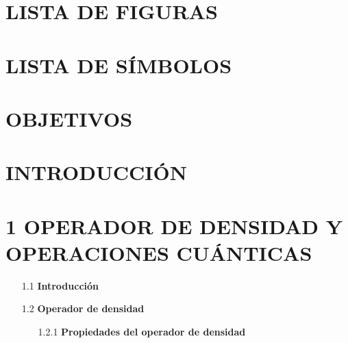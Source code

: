 \documentclass[12pt,oneside]{book}\raggedbottom{} %
\begin{document}
\begin{sloppypar}
{{\section*{LISTA DE FIGURAS}



\section*{LISTA DE SÍMBOLOS}

\section*{OBJETIVOS}

\section*{INTRODUCCIÓN}

\section*{1 OPERADOR DE DENSIDAD Y OPERACIONES CUÁNTICAS}
\begin{itemize}
\item[1.1]\textbf{Introducción}




\item[1.2] \textbf{Operador de densidad}

\begin{itemize}
  \item[1.2.1] \textbf{Propiedades del operador de densidad} 
  

\end{itemize}
\end{itemize}}}
\end{sloppypar}
\end{document}
